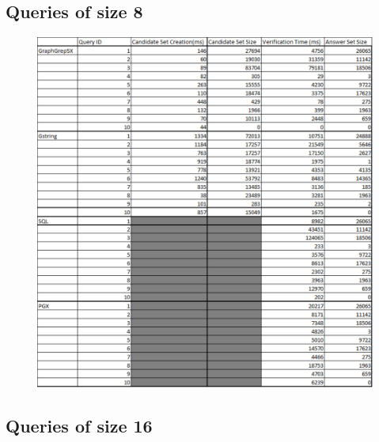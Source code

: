 \documentclass[12pt,a4paper]{report}
\begin{document}
\newpage
\subsection*{Queries of size 8}

\begin{figure}[h]
	\centering
	\includegraphics[width=1\textwidth]{../img/q8.pdf}
\end{figure}

\newpage
\subsection*{Queries of size 16}
\end{document}
